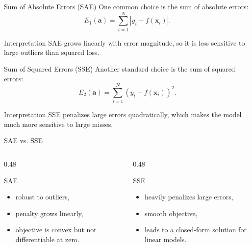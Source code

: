 \documentclass[12pt]{beamer}
\begin{document}
\begin{frame}{Sum of Absolute Errors (SAE)}
  \justifying
  One common choice is the sum of absolute errors:
  \[
    E_1(\mathbf{a}) = \sum_{i=1}^{N} \left|y_i - f(\mathbf{x}_i)\right|.
  \]
  \begin{conceptbox}{Interpretation}
    SAE grows linearly with error magnitude, so it is less sensitive to large outliers than squared loss.
  \end{conceptbox}
\end{frame}

\begin{frame}{Sum of Squared Errors (SSE)}
  \justifying
  Another standard choice is the sum of squared errors:
  \[
    E_2(\mathbf{a}) = \sum_{i=1}^{N} \left(y_i - f(\mathbf{x}_i)\right)^2.
  \]
  \begin{conceptbox}{Interpretation}
    SSE penalizes large errors quadratically, which makes the model much more sensitive to large misses.
  \end{conceptbox}
\end{frame}

\begin{frame}{SAE vs. SSE}
  \justifying
  \begin{columns}[T]
    \begin{column}{0.48\textwidth}
      \begin{examplebox}{SAE}
        \begin{itemize}
          \item robust to outliers,
          \item penalty grows linearly,
          \item objective is convex but not differentiable at zero.
        \end{itemize}
      \end{examplebox}
    \end{column}
    \begin{column}{0.48\textwidth}
      \begin{warningbox}{SSE}
        \begin{itemize}
          \item heavily penalizes large errors,
          \item smooth objective,
          \item leads to a closed-form solution for linear models.
        \end{itemize}
      \end{warningbox}
    \end{column}
  \end{columns}
\end{frame}
\end{document}
